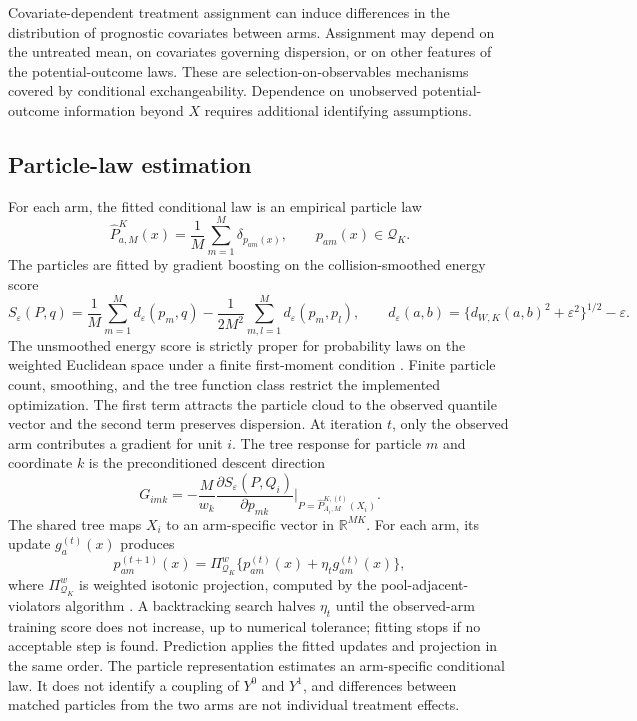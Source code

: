 \documentclass[11pt]{article}
\begin{document}
Covariate-dependent treatment assignment can induce differences in the distribution of prognostic covariates between arms. Assignment may depend on the untreated mean, on covariates governing dispersion, or on other features of the potential-outcome laws. These are selection-on-observables mechanisms covered by conditional exchangeability. Dependence on unobserved potential-outcome information beyond $X$ requires additional identifying assumptions.

\subsection{Particle-law estimation}\label{sec:boosting}

For each arm, the fitted conditional law is an empirical particle law
\[
 \widehat P_{a,M}^K(x)=\frac{1}{M}\sum_{m=1}^{M}\delta_{p_{am}(x)},
 \qquad p_{am}(x)\in\mathcal{Q}_K.
\]
The particles are fitted by gradient boosting \citep{friedman2001greedy} on the collision-smoothed
energy score
\[
 S_\varepsilon(P,q)=\frac{1}{M}\sum_{m=1}^{M}d_{\varepsilon}(p_m,q)
 -\frac{1}{2M^2}\sum_{m,l=1}^{M}d_{\varepsilon}(p_m,p_l),
 \qquad
 d_{\varepsilon}(a,b)=\{d_{W,K}(a,b)^2+\varepsilon^2\}^{1/2}-\varepsilon.
\]
The unsmoothed energy score is strictly proper for probability laws on the weighted Euclidean space under a finite first-moment condition \citep{gneiting2007proper}. Finite particle count, smoothing, and the tree function class restrict the implemented optimization. The first term attracts the particle cloud to the observed quantile vector and
the second term preserves dispersion. At iteration $t$, only the observed arm contributes a gradient for unit $i$. The tree response for particle $m$ and coordinate $k$ is the preconditioned descent direction
\[
 G_{imk}=-\frac{M}{w_k}\frac{\partial S_\varepsilon(P,Q_i)}{\partial p_{mk}}
 \bigg|_{P=\widehat P_{A_i,M}^{K,(t)}(X_i)}.
\]
The shared tree maps $X_i$ to an arm-specific vector in $\mathbb{R}^{M K}$. For each arm, its update $g_a^{(t)}(x)$ produces
\[
 p_{am}^{(t+1)}(x)=\Pi_{\mathcal Q_K}^{w}\{p_{am}^{(t)}(x)+\eta_t g_{am}^{(t)}(x)\},
\]
where $\Pi_{\mathcal Q_K}^{w}$ is weighted isotonic projection, computed by the pool-adjacent-violators algorithm \citep{barlow1972isotonic}. A backtracking search halves $\eta_t$ until the observed-arm training score does not increase, up to numerical tolerance; fitting stops if no acceptable step is found. Prediction applies the fitted updates and projection in the same order.
The particle representation
estimates an arm-specific conditional law. It does not identify a coupling of
$Y^0$ and $Y^1$, and differences between matched particles from the two arms
are not individual treatment effects.
\end{document}
